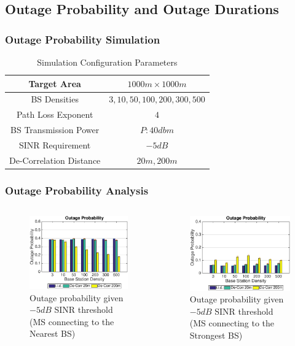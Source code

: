 \documentclass{beamer}
\begin{document}
\begin{frame}
\subsection{Outage Probability and Outage Durations}
\frametitle{Outage Probability Simulation}
\begin{table}
 \centering
 \caption{\label{SystemConfig2}Simulation Configuration Parameters}

 \begin{tabular}{|c|c|}

 \hline
 Target Area & $1000m\times 1000m$\\
 \hline
 BS Densities & $3, 10, 50, 100, 200, 300, 500$\\
 \hline
 Path Loss Exponent & $4$\\
 \hline
 BS Transmission Power & $P: 40dbm$\\
 \hline
 SINR Requirement & $-5dB$\\
 \hline
 De-Correlation Distance & $20m, 200m$\\
 \hline
 \end{tabular}

 \end{table}
\end{frame}

\begin{frame}
\frametitle{Outage Probability Analysis}
\begin{columns}[c]
 \begin{figure}
 \centering
 \includegraphics[width=6cm]{NBMax1000OutageProbThresh-5iid.eps}
 \caption{Outage probability given $-5dB$ SINR threshold (MS connecting to the Nearest BS)}
 \label{fig: outprob1}
 \end{figure}
 \begin{figure}
 \centering
 \includegraphics[width=6cm]{MaxMax1000OutageProbThresh-5iid.eps}
 \caption{Outage probability given $-5dB$ SINR threshold (MS connecting to the Strongest BS)}
 \label{fig: outprobs2}
 \end{figure}
  \end{columns}
\end{frame}
\end{document}
